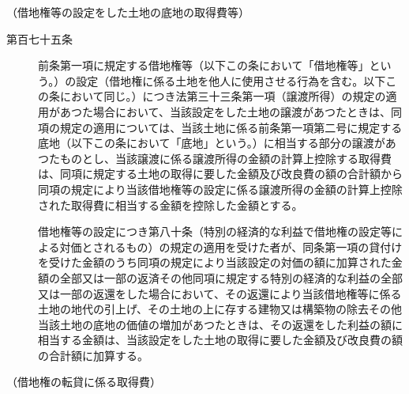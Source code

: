 \documentclass[twocolumn,a4j,10pt]{ltjtarticle}
\begin{document}
\noindent\hspace{10pt}（借地権等の設定をした土地の底地の取得費等）
\begin{description}
\item[第百七十五条]前条第一項に規定する借地権等（以下この条において「借地権等」という。）の設定（借地権に係る土地を他人に使用させる行為を含む。以下この条において同じ。）につき法第三十三条第一項（譲渡所得）の規定の適用があつた場合において、当該設定をした土地の譲渡があつたときは、同項の規定の適用については、当該土地に係る前条第一項第二号に規定する底地（以下この条において「底地」という。）に相当する部分の譲渡があつたものとし、当該譲渡に係る譲渡所得の金額の計算上控除する取得費は、同項に規定する土地の取得に要した金額及び改良費の額の合計額から同項の規定により当該借地権等の設定に係る譲渡所得の金額の計算上控除された取得費に相当する金額を控除した金額とする。
\item[]借地権等の設定につき第八十条（特別の経済的な利益で借地権の設定等による対価とされるもの）の規定の適用を受けた者が、同条第一項の貸付けを受けた金額のうち同項の規定により当該設定の対価の額に加算された金額の全部又は一部の返済その他同項に規定する特別の経済的な利益の全部又は一部の返還をした場合において、その返還により当該借地権等に係る土地の地代の引上げ、その土地の上に存する建物又は構築物の除去その他当該土地の底地の価値の増加があつたときは、その返還をした利益の額に相当する金額は、当該設定をした土地の取得に要した金額及び改良費の額の合計額に加算する。
\end{description}
\noindent\hspace{10pt}（借地権の転貸に係る取得費）
\end{document}

